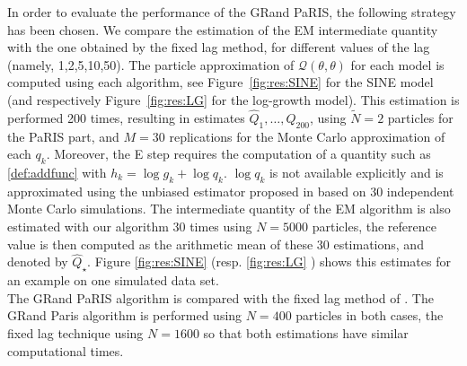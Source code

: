\documentclass[12pt]{article}
\newcommand{\1}{\mathrm{1}}
\newcommand{\hQ}{\widehat{Q}}
\begin{document}
In order to evaluate the performance of the GRand PaRIS, the following strategy has been chosen. We compare the estimation of the EM intermediate quantity with the one obtained by the fixed lag method, for different values of the lag (namely, 1,2,5,10,50). The particle approximation of $\mathcal{Q}(\theta,\theta)$ for each model  is computed using each algorithm, see Figure~\ref{fig:res:SINE} for the SINE model (and respectively Figure~\ref{fig:res:LG} for the log-growth model). This estimation is performed 200 times, resulting in estimates $\hQ_1,\dots,\hQ_{200}$, using $\tilde{N}=2$ particles for the PaRIS part, and $M=30$ replications for the Monte Carlo approximation of each $q_k$.  Moreover, the E step requires the computation of a quantity such as \eqref{def:addfunc} with $h_k= \log g_k + \log q_k$.  $\log q_k$ is not available explicitly and is approximated using the unbiased estimator proposed in \cite[Appendix B]{olsson:strojby:2011} based on 30 independent Monte Carlo simulations.
The intermediate quantity of the EM algorithm is also estimated                                                                                                                                                                                                                                                                                                                                                                                                                                                                                                                                                      with our algorithm 30 times using $N=5000$ particles, the reference value is then computed as the arithmetic mean of these 30 estimations, and denoted by $\hQ_\star$. Figure \ref{fig:res:SINE} (resp. \ref{fig:res:LG} ) shows this estimates for an example on one simulated data set.\\ 
The GRand PaRIS algorithm is compared with the fixed lag method of \cite{olsson:strojby:2011}. The GRand Paris algorithm is performed using $N=400$ particles in both cases, the fixed lag technique using $N=1600$ so that both estimations have similar computational times.
\end{document}
